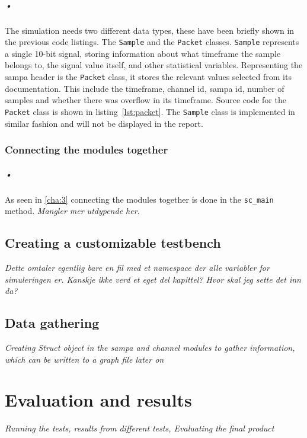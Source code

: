 \documentclass[a4paper, 12pt]{report}
\newcommand{\codeword}[1]{\texttt{#1}}
\begin{document}
\paragraph{•}
The simulation needs two different data types, these have been briefly shown in the previous code listings.
The \codeword{Sample} and the \codeword{Packet} classes.
\codeword{Sample} represents a single 10-bit signal, storing information about what timeframe the sample belongs to, the signal value itself, and other statistical variables.
Representing the \gls{sampa} header is the \codeword{Packet} class, it stores the relevant values selected from its documentation.
This include the timeframe, channel id, sampa id, number of samples and whether there was overflow in its timeframe.
Source code for the \codeword{Packet} class is shown in listing~\ref{lst:packet}.
The \codeword{Sample} class is implemented in similar fashion and will not be displayed in the report. 

\begin{minipage}{\linewidth}

\end{minipage}

\subsection{Connecting the modules together}
\paragraph{•}
As seen in \ref{cha:3} connecting the modules together is done in the \codeword{sc\_main} method.
\textit{Mangler mer utdypende her.}

\section{Creating a customizable testbench}
\textit{Dette omtaler egentlig bare en fil med et namespace der alle variabler for simuleringen er. Kanskje ikke verd et eget del kapittel? Hvor skal jeg sette det inn da?}

\section{Data gathering}
\textit{Creating Struct object in the sampa and channel modules to gather information, which can be written to a graph file later on}

\chapter{Evaluation and results}
\textit{Running the tests, results from different tests, Evaluating the final product}
\end{document}
